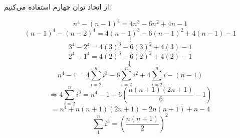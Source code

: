 	\p
از اتحاد توان چهارم استفاده می‌کنیم:

        $$n^4 - (n - 1)^4 = 4n^3 - 6n^2 + 4n - 1$$
        $$(n - 1)^4 - (n - 2)^4 = 4(n - 1)^3 - 6(n - 1)^2 + 4(n - 1) - 1$$
       	$$\vdots$$
       	$$3^4 - 2^4 = 4(3)^3 - 6(3)^2 + 4(3) - 1$$
       	$$2^4 - 1^4 = 4(2)^3 - 6(2)^2 + 4(2) -1$$
        $$\Downarrow$$
        $$n^4 - 1 = 4\sum\limits_{i=2}^{n}i^3 - 6\sum\limits_{i=2}^{n}i^2 + 4\sum\limits_{i=2}^{n}i - (n - 1)$$
        $$\Rightarrow 4\sum\limits_{i=2}^{n}i^3 = n^4 - 1 + 6(\frac{n(n+1)(2n+1)}{6} - 1)$$
        $$= n^4 + n(n + 1)(2n + 1) - 2n(n + 1) + n - 4$$
        $$\sum\limits_{1}^{n}i^3 = (\frac{n(n + 1)}{2})^2$$